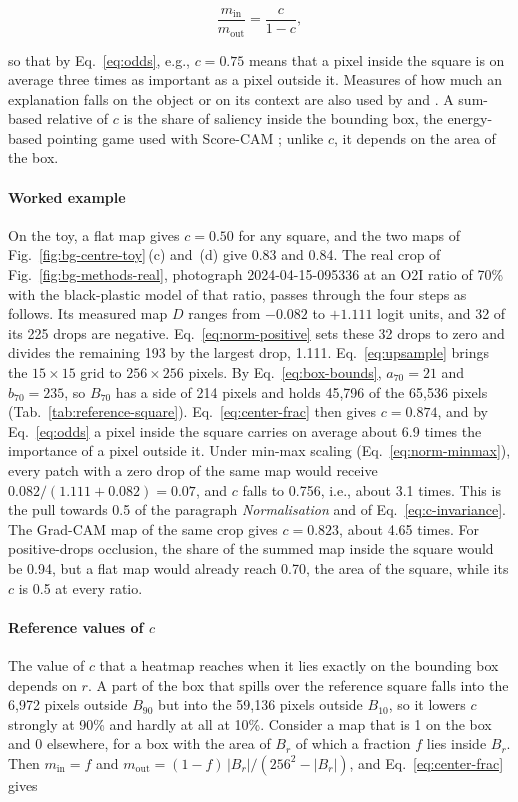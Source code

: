 \begin{equation}
\frac{m_{\mathrm{in}}}{m_{\mathrm{out}}} = \frac{c}{1 - c},
\label{eq:odds}
\end{equation}

so that by Eq.~\eqref{eq:odds}, e.g., $c = 0.75$ means that a pixel inside the square
is on average three times as important as a pixel outside it. Measures of how much an
explanation falls on the object or on its context are also used by \citet{dreyer2023revealing} and \citet{le2025shortcut}. A sum-based relative of $c$ is
the share of saliency inside the bounding box, the energy-based pointing game used with
Score-CAM \citep{wang2020scorecam}; unlike $c$, it depends on the area of the box.

\paragraph{Worked example}
\label{sec:methodology-example}
On the toy, a flat map gives $c = 0.50$ for any square, and the two maps of
Fig.~\ref{fig:bg-centre-toy}\,(c) and~(d) give 0.83 and 0.84. The real crop of
Fig.~\ref{fig:bg-methods-real}, photograph 2024-04-15-095336 at an O2I ratio of 70\%
with the black-plastic model of that ratio, passes through the four steps as follows.
Its measured map $D$ ranges from $-0.082$ to $+1.111$ logit units, and 32 of its 225
drops are negative. Eq.~\eqref{eq:norm-positive} sets these 32 drops to zero and divides
the remaining 193 by the largest drop, 1.111. Eq.~\eqref{eq:upsample} brings the
$15 \times 15$ grid to $256 \times 256$ pixels. By Eq.~\eqref{eq:box-bounds},
$a_{70} = 21$ and $b_{70} = 235$, so $B_{70}$ has a side of 214 pixels and holds 45,796
of the 65,536 pixels (Tab.~\ref{tab:reference-square}). Eq.~\eqref{eq:center-frac} then
gives $c = 0.874$, and by Eq.~\eqref{eq:odds} a pixel inside the square carries on average
about 6.9 times the importance of a pixel outside it. Under min-max scaling
(Eq.~\eqref{eq:norm-minmax}), every patch with a zero drop of the same map would receive
$0.082 / (1.111 + 0.082) = 0.07$, and $c$ falls to 0.756, i.e., about 3.1 times. This is
the pull towards 0.5 of the paragraph \emph{Normalisation} and of
Eq.~\eqref{eq:c-invariance}. The Grad-CAM map of the same
crop gives $c = 0.823$, about 4.65 times. For positive-drops occlusion, the share of the
summed map inside the square would be 0.94, but a flat map would already reach 0.70,
the area of the square, while its $c$ is 0.5 at every ratio.

\paragraph{Reference values of $c$}
\label{sec:methodology-reference}
The value of $c$ that a heatmap reaches when it lies exactly on the bounding box
depends on $r$. A part of the box that spills over the reference square falls into the
6,972 pixels outside $B_{90}$ but into the 59,136 pixels outside $B_{10}$, so it lowers
$c$ strongly at 90\% and hardly at all at 10\%. Consider a map that is 1 on the box and 0 elsewhere, for a box with the
area of $B_r$ of which a fraction $f$ lies inside $B_r$. Then $m_{\mathrm{in}} = f$ and
$m_{\mathrm{out}} = (1 - f)\,|B_r| / (256^2 - |B_r|)$, and Eq.~\eqref{eq:center-frac}
gives

